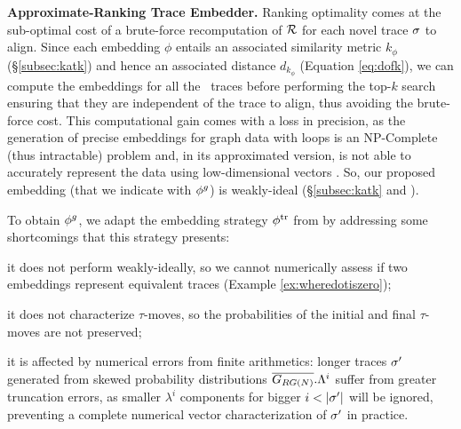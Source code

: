\vspace{+0.2cm}	
\noindent
\textbf{Approximate-Ranking Trace Embedder.}\label{subsec:ate}
Ranking optimality comes at the sub-optimal cost of a brute-force recomputation of $\mathcal{R}$ for each novel trace $\sigma$ to align.
Since each embedding $\phi$ entails an associated similarity metric $k_\phi$ (\S\ref{subsec:katk}) and hence an associated
distance $d_{k_\phi}$ (Equation \ref{eq:dofk}), we can compute the embeddings for all the \unravelled\ traces
before performing the top-$k$ search ensuring that they are independent of the trace to align, thus avoiding the brute-force cost. This computational gain comes with a loss in precision, as the generation of precise embeddings for graph data with loops is an NP-Complete (thus intractable) problem \cite{GartnerFW03} and, in its approximated version, is not able to accurately represent the data using low-dimensional vectors \cite{Seshadhri5631}. So, our proposed embedding (that we indicate with ${\phi^{g}}$) is weakly-ideal (\S\ref{subsec:katk} and \cite{Gartner03}).

{To obtain ${\phi^{g}}$, we adapt the embedding strategy} ${\phi^{\text{tr}}}$ from \cite{LodhiSSCW02} {by addressing some short\-comings that this strategy presents:}
\begin{alphalist}
 \item it does not perform weakly-ideally, so we cannot numerically assess if two embeddings represent equivalent traces (Example \ref{ex:wheredotiszero});
 \item it does not characterize $\tau$-moves, so the probabilities of the initial and final $\tau$-moves are not preserved;
 \item it is affected by numerical errors from finite arithmetics: longer traces ${\sigma'}$ generated from skewed probability distributions $\overline{G_{RG(N)}}.\Lambda^i$ suffer from greater truncation errors, as smaller $\lambda^i$ components for bigger $i<|\nonlogtrace|$ will be ignored, preventing a complete numerical vector characterization of  ${\sigma'}$ in practice.
\end{alphalist}

